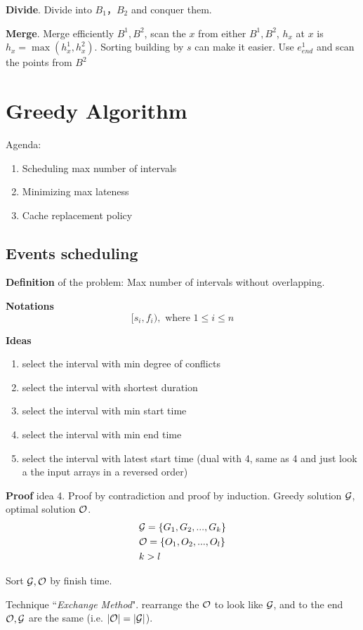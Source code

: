 \documentclass[a4paper]{report}
\begin{document}
\textbf{Divide}. Divide into $B_1， B_2$ and conquer them. 

\textbf{Merge}. Merge efficiently $B^1, B^2$, scan the $x$ from either $B^1, B^2$, $h_x$ at $x$ is $h_x=\max(h^1_x,h_x^2)$. Sorting building by $s$ can make it easier. Use $e^1_{end}$ and scan the points from $B^2$

\chapter{Greedy Algorithm}
Agenda:
\begin{enumerate}
\item Scheduling max number of intervals 
\item Minimizing max lateness
\item Cache replacement policy
\end{enumerate}
\section{Events scheduling}
\textbf{Definition} of the problem: Max number of intervals without overlapping. 

\textbf{Notations}
$$
[s_i, f_i), \text{ where }1 \leq i \leq n
$$

\textbf{Ideas}
\begin{enumerate}
\item select the interval with min degree of conflicts 
\item select the interval with shortest duration 
\item select the interval with min start time 
\item select the interval with min end time
\item select the interval with latest start time (dual with 4, same as 4 and just look a the input arrays in a reversed order)
\end{enumerate}

\textbf{Proof} idea 4. Proof by contradiction and proof by induction. Greedy solution $\mathcal{G}$, optimal solution $\mathcal{O}$. 
\begin{align*}
& \mathcal{G} = \{G_1, G_2, ..., G_k\}  \\
& \mathcal{O} = \{O_1, O_2, ..., O_l\} \\
& k > l 
\end{align*}

Sort $\mathcal{G}, \mathcal{O}$  by finish time. 

Technique ``\textit{Exchange Method}". rearrange the $\mathcal{O}$ to look like $\mathcal{G}$, and to the end $\mathcal{O}, \mathcal{G}$ are the same (i.e. $|\mathcal{O}|=|\mathcal{G}|$). 
\end{document}
